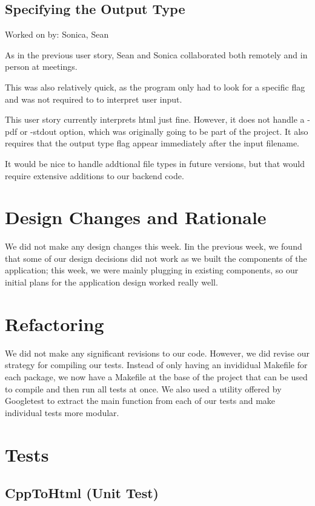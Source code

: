 \documentclass[12pt]{article}
\begin{document}
\subsection{Specifying the Output Type}

Worked on by: Sonica, Sean

As in the previous user story, Sean and Sonica collaborated both remotely and in person at meetings.

This was also relatively quick, as the program only had to look for a specific flag and was not required to to interpret user input.

This user story currently interprets html just fine. However, it does not handle a -pdf or -stdout option, which was originally going to be part of the project. It also requires that the output type flag appear immediately after the input filename.

It would be nice to handle addtional file types in future versions, but that would require extensive additions to our backend code.



 \section{Design Changes and Rationale}

We did not make any design changes this week. Iin the previous week, we found that some of our design decisions did not work as we built the components of the application; this week, we were mainly plugging in existing components, so our initial plans for the application design worked really well. \section{Refactoring}

We did not make any significant revisions to our code. However, we did revise our strategy for compiling our tests. Instead of only having an invididual Makefile for each package, we now have a Makefile at the base of the project that can be used to compile and then run all tests at once. We also used a utility offered by Googletest to extract the main function from each of our tests and make individual tests more modular. \section{Tests}
\subsection{CppToHtml (Unit Test)}
\end{document}
